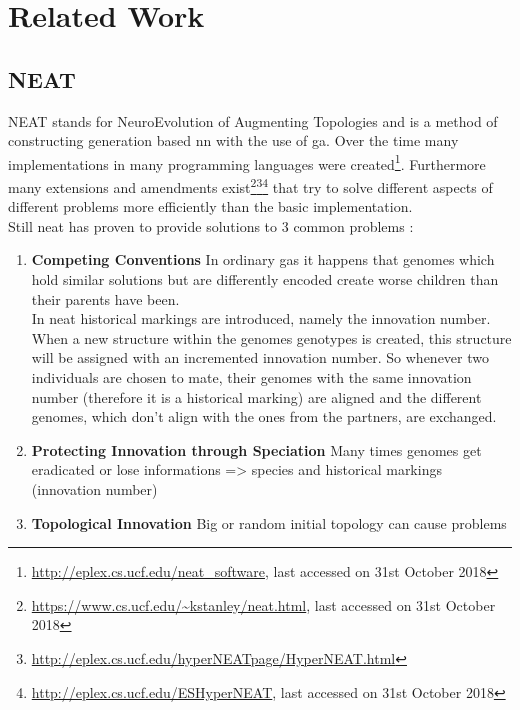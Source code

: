 %
\chapter{Related Work}
\label{sec:related}

\section{NEAT}
\label{sec:related:neat}
	NEAT stands for NeuroEvolution of Augmenting Topologies and is a method of constructing generation based \gls{nn} with the use of \gls{ga}. \cite{stanley_evolving_2002}
	Over the time many implementations in many programming languages were created\footnote{\url{http://eplex.cs.ucf.edu/neat_software}, last accessed on 31st October 2018}. Furthermore many extensions and amendments exist\footnote{\url{https://www.cs.ucf.edu/~kstanley/neat.html}, last accessed on 31st October 2018}\footnote{\url{http://eplex.cs.ucf.edu/hyperNEATpage/HyperNEAT.html}}\footnote{\url{http://eplex.cs.ucf.edu/ESHyperNEAT}, last accessed on 31st October 2018} that try to solve different aspects of different problems more efficiently than the basic implementation.\cite{kohl_integrated_2011} \\
	Still \gls{neat} has proven to provide solutions to 3 common problems \cite{stanley_evolving_2002}: 
	\begin{enumerate}
		\item \textbf{Competing Conventions}
			In ordinary \gls{ga}s it happens that genomes which hold similar solutions but are differently encoded create worse children than their parents have been. \\
			In \gls{neat} historical markings are introduced, namely the innovation number. When a new structure within the genomes genotypes is created, this structure will be assigned with an incremented innovation number. So whenever two individuals are chosen to mate, their genomes with the same innovation number (therefore it is a historical marking) are aligned and the different genomes, which don't align with the ones from the partners, are exchanged.
		\item \textbf{Protecting Innovation through Speciation}
			Many times genomes get eradicated or lose informations => species and historical markings (innovation number)
		\item \textbf{Topological Innovation}
			Big or random initial topology can cause problems
	\end{enumerate}

